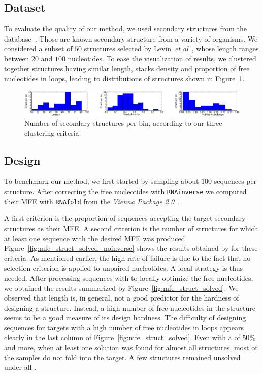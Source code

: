 \subsection{Dataset}
To evaluate the quality of our method, we used secondary
structures from the \RNASTRAND database~\cite{andronescu2008rna}.
Those are known secondary structure from a variety of organisms.
We considered a subset of $50$ structures selected by Levin~\emph{et al}~\cite{Levin:2012kx}, 
whose length ranges between $20$ and $100$ nucleotides. 
 To ease the visualization of results, we clustered together structures
 having similar length, stacks density and proportion of free nucleotides in loops, leading to distributions of structures shown in Figure~\ref{fig:bins}.

 \begin{figure}[ht!]
 	\centering
	\includegraphics[width=\textwidth]{Figures/bins_distribution.png}
	\caption{Number of secondary structures per bin, according to our three clustering criteria.}
	\label{fig:bins}
 \end{figure}
 
 
\subsection{Design}
 To benchmark our method, we first started by sampling about $100$ sequences per structure. After correcting the free nucleotides with
 \texttt{RNAinverse} we computed their MFE with \texttt{RNAfold} from the \textit{Vienna Package 2.0}~\cite{Hofacker:1994}.
 
A first criterion is the proportion of sequences accepting the target
secondary structures as their MFE. A second criterion is the number of structures
for which at least one sequence with the desired MFE was produced.
Figure~\ref{fig:mfe_struct_solved_noinverse} shows the results obtained by \ourprog for these criteria. As mentioned earlier, the high rate of failure
is due to the fact that no selection criterion is applied to
unpaired nucleotides. A local strategy is thus needed.
After processing \ourprog sequences with \RNAinverse to 
locally optimize the free nucleotides, we obtained the results 
summarized by Figure~\ref{fig:mfe_struct_solved}. We observed
that length is, in general, not a good predictor for the hardness of designing a structure. 
Instead, a high number of free nucleotides in the structure seems to be a 
good measure of its design hardness. 
 The difficulty of 
designing sequences for targets with a high number of free nucleotides 
 in loops appears clearly in the last column of Figure~\ref{fig:mfe_struct_solved}.
Even with a \GCContent of $50\%$ and more, when at least
one solution was found for almost all structures, most of the samples 
do not fold into the target. A few structures remained unsolved under
all \GCContent.


